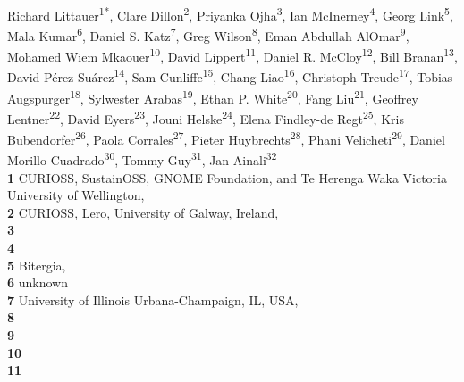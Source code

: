 \documentclass[10pt,letterpaper]{article}
\begin{document}
\vspace*{0.2in}

\begin{flushleft}
{\Large
\textbf{}
}
\newline
\\
Richard Littauer\textsuperscript{1*},
Clare Dillon\textsuperscript{2},
Priyanka Ojha\textsuperscript{3},
Ian McInerney\textsuperscript{4},
Georg Link\textsuperscript{5},
Mala Kumar\textsuperscript{6},
Daniel S. Katz\textsuperscript{7},
Greg Wilson\textsuperscript{8},
Eman Abdullah AlOmar\textsuperscript{9},
Mohamed Wiem Mkaouer\textsuperscript{10},
David Lippert\textsuperscript{11},
Daniel R. McCloy\textsuperscript{12},
Bill Branan\textsuperscript{13},
David Pérez-Suárez\textsuperscript{14},
Sam Cunliffe\textsuperscript{15},
Chang Liao\textsuperscript{16},
Christoph Treude\textsuperscript{17},
Tobias Augspurger\textsuperscript{18},
Sylwester Arabas\textsuperscript{19},
Ethan P. White\textsuperscript{20},
Fang Liu\textsuperscript{21},
Geoffrey Lentner\textsuperscript{22},
David Eyers\textsuperscript{23},
Jouni Helske\textsuperscript{24},
Elena Findley-de Regt\textsuperscript{25},
Kris Bubendorfer\textsuperscript{26},
Paola Corrales\textsuperscript{27},
Pieter Huybrechts\textsuperscript{28},
Phani Velicheti\textsuperscript{29},
Daniel Morillo-Cuadrado\textsuperscript{30},
Tommy Guy\textsuperscript{31},
Jan Ainali\textsuperscript{32}
\\
\bigskip
\textbf{1} CURIOSS, SustainOSS, GNOME Foundation, and Te Herenga Waka Victoria University of Wellington, \\
\textbf{2} CURIOSS, Lero, University of Galway, Ireland, \\
\textbf{3} \\
\textbf{4} \\
\textbf{5} Bitergia, \\
\textbf{6} unknown\\
\textbf{7} University of Illinois Urbana-Champaign, IL, USA, \\
\textbf{8} \\
\textbf{9} \\
\textbf{10} \\
\textbf{11} \\

\end{flushleft}
\end{document}
